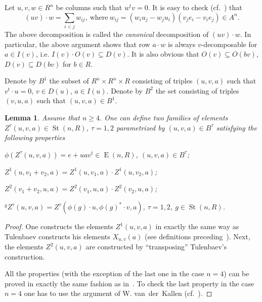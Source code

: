 \documentclass[12pt]{amsart}
\theoremstyle{plain} \declaretheorem[name=Theorem, Refname={Theorem,Theorems}]{thm} \Crefname{thm}{Theorem}{Theorems}
\numberwithin{equation}{section}
\newtheorem{lemma}{Lemma} \numberwithin{lemma}{section} \Crefname{lemma}{Lemma}{Lemmas}
\theoremstyle{definition} \newtheorem{dfn}[lemma]{Definition} \Crefname{dfn}{Definition}{Definitions}
\theoremstyle{remark} \newtheorem{rem}[lemma]{Remark} \Crefname{rem}{Remark}{Remarks}
\newcommand{\St}{\operatorname{\mathrm{St}}}
\newcommand{\E}{\operatorname{\mathrm{E}}}
\begin{document}
Let $u,v,w\in R^n$ be columns such that $w^tv=0$.
It is easy to check (cf.~\cite[Lemma~3.2]{Ka}) that 
$$(uv)\cdot w = \sum_{i<j}w_{ij},\ \text{where}\ w_{ij} = (w_iu_j - w_ju_i)(v_je_i - v_ie_j)\in{}\!A^n.$$
The above decomposition is called the \emph{canonical} decomposition of $(uv)\cdot w$.
In particular, the above argument shows that row $a\cdot w$ is always $v$-decomposable for $a\in I(v)$, i.e. $I(v) \cdot O(v) \subseteq D(v)$.
It is also obvious that $O(v)\subseteq O(bv)$, $D(v)\subseteq D(bv)$ for $b \in R$.

Denote by $B^1$ the subset of $R^n \times R^n \times R$ consisting of triples $(u, v, a)$ such that $v^t \cdot u = 0$, $v \in D(u)$, $a \in I(u)$.
Denote by $B^2$ the set consisting of triples $(v, u, a)$ such that $(u, v, a) \in B^1$.

\begin{lemma} \label{lem:Zproperties}
Assume that $n \geq 4$.
One can define two families of elements $Z^\tau(u, v, a) \in \St(n, R)$, $\tau=1,2$ parametrized by $(u, v, a) \in B^\tau$ satisfying the following properties
 \begin{lemlist}
  \item \label{rel:proj} $\phi(Z^\tau(u, v, a)) = e + uav^t \in \E(n, R)$, $(u,v,a) \in B^\tau$;
  \item \label{rel:add1} $Z^{1}(u, v_1 + v_2, a) = Z^{1}(u, v_1, a) \cdot Z^{1}(u, v_2, a)$;
  \item \label{rel:add2} $Z^{2}(v_1 + v_2, u, a) = Z^{2}(v_1, u, a) \cdot Z^{2}(v_2, u, a)$;
  \item \label{rel:conj} ${}^{g}\! Z^{\tau}(u, v, a) = Z^{\tau}(\phi(g) \cdot u, \phi(g)^* \cdot v, a)$, $\tau = 1,2$, $g \in \St(n, R)$.
 \end{lemlist}
\end{lemma}
\begin{proof}
One constructs the elements $Z^1(u,v,a)$ in exactly the same way as Tulenbaev constructs his elements $X_{u,v}(a)$ (see definitions preceding~\cite[Lemma~1.2]{T}).
Next, the elements $Z^2(u,v,a)$ are constructed by ``transposing'' Tulenbaev's construction.

All the properties (with the exception of the last one in the case $n=4$) can be proved in exactly the same fashion as in~\cite[Lemma~1.3]{T}.
To check the last property in the case $n=4$ one has to use the argument of W. van~der~Kallen (cf.~\cite{Ka}).
\end{proof}
\end{document}
